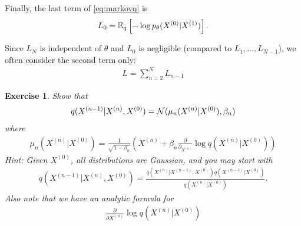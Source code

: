 \documentclass[11pt, a4paper]{article}
\newtheorem{exercise}{Exercise}
\begin{document}
Finally, the last term of \eqref{eq:markovq} is
\begin{align}
    L_0 = \mathbb{E}_q\left[-\log p_{\theta}(X^{(0)}|X^{(1)})\right].
\end{align}

Since $L_N$ is independent of $\theta$ and $L_0$ is negligible (compared to $L_1, \dots, L_{N-1}$), we often consider the second term only:
\begin{align}
    L = \sum_{n=2}^N L_{n-1}
\end{align}

\begin{exercise}
    Show that 
    \begin{align}
        q(X^{(n-1)}|X^{(n)}, X^{(0)}) = {\cal N}(\mu_n(X^{(n)}|X^{(0)}), \beta_n)
    \end{align}
    where
    \begin{align}
        \mu_n(X^{(n)}|X^{(0)}) = \frac{1}{\sqrt{1-\beta_n}} \left(X^{(n)} + \beta_n \frac{\partial}{\partial_{X^{(n)}}} \log q (X^{(n)}|X^{(0)})\right)
    \end{align}
    Hint: Given $X^{(0)}$, all distributions are Gaussian, and you may start with
    \begin{align}
        q(X^{(n-1)}|X^{(n)}, X^{(0)}) = \frac{q(X^{(n)}|X^{(n-1)}, X^{(0)}) q(X^{(n-1)}|X^{(0)})}{q(X^{(n)}|X^{(0)})}.
    \end{align}
    Also note that we have an analytic formula for
    \begin{align}
        \frac{\partial}{\partial X^{(n)}} \log q (X^{(n)}|X^{(0)})
    \end{align}
\end{exercise}
\end{document}
